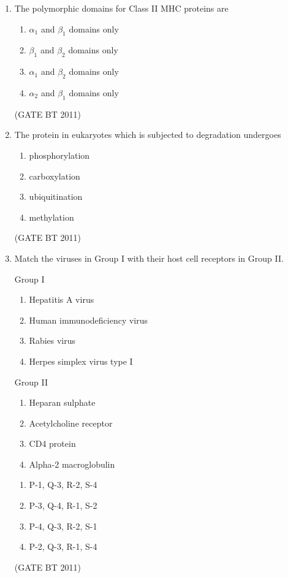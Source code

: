 \documentclass[journal,12pt,onecolumn]{IEEEtran}
\begin{document}
\begin{enumerate}
\item The polymorphic domains for Class II MHC proteins are  
\begin{multicols}{2}
\begin{enumerate}
\item $\alpha_1$ and $\beta_1$ domains only  
\item $\beta_1$ and $\beta_2$ domains only  
\item $\alpha_1$ and $\beta_2$ domains only  
\item $\alpha_2$ and $\beta_1$ domains only  
\end{enumerate}
\end{multicols} \hfill(GATE BT 2011)

\item The protein in eukaryotes which is subjected to degradation undergoes  
\begin{multicols}{2}
\begin{enumerate}
\item phosphorylation  
\item carboxylation  
\item ubiquitination  
\item methylation  
\end{enumerate}
\end{multicols} \hfill(GATE BT 2011)

\item Match the viruses in Group I with their host cell receptors in Group II.  
\begin{multicols}{2}
  Group I
  \begin{enumerate}
    \item[P.] Hepatitis A virus  
    \item[Q.] Human immunodeficiency virus  
    \item[R.] Rabies virus  
    \item[S.] Herpes simplex virus type I  
  \end{enumerate}


  Group II
  \begin{enumerate}
    \item[1.] Heparan sulphate  
    \item[2.] Acetylcholine receptor  
    \item[3.] CD4 protein  
    \item[4.] Alpha-2 macroglobulin  
  \end{enumerate}
\end{multicols} 

  \begin{multicols}{2}
  \begin{enumerate}
    \item P-1, Q-3, R-2, S-4  
    \item P-3, Q-4, R-1, S-2  
    \item P-4, Q-3, R-2, S-1  
    \item P-2, Q-3, R-1, S-4  
  \end{enumerate}
  \end{multicols} \hfill(GATE BT 2011)



\end{enumerate}
\end{document}
